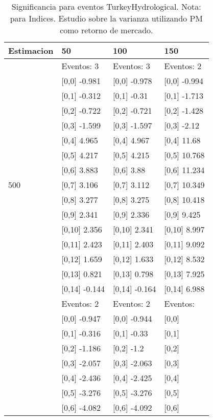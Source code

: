 \begin{table}

\caption{Significancia para eventos TurkeyHydrological. Nota: para Indices. Estudio sobre la varianza utilizando PM como retorno de mercado.}
\centering
\begin{tabular}[t]{llll}
\toprule
Estimacion & 50 & 100 & 150\\
\midrule
 & Eventos:  3 & Eventos:  3 & Eventos:  2\\
 & {}[0,0] -0.981 & {}[0,0] -0.978 & {}[0,0] -0.994\\
 & {}[0,1] -0.312 & {}[0,1] -0.31 & {}[0,1] -1.713\\
 & {}[0,2] -0.722 & {}[0,2] -0.721 & {}[0,2] -1.428\\
 & {}[0,3] -1.599 & {}[0,3] -1.597 & {}[0,3] -2.12\\
\addlinespace
 & {}[0,4] 4.965 & {}[0,4] 4.967 & {}[0,4] 11.68\\
 & {}[0,5] 4.217 & {}[0,5] 4.215 & {}[0,5] 10.768\\
 & {}[0,6] 3.883 & {}[0,6] 3.88 & {}[0,6] 11.234\\
500 & {}[0,7] 3.106 & {}[0,7] 3.112 & {}[0,7] 10.349\\
 & {}[0,8] 3.277 & {}[0,8] 3.275 & {}[0,8] 10.418\\
\addlinespace
 & {}[0,9] 2.341 & {}[0,9] 2.336 & {}[0,9] 9.425\\
 & {}[0,10] 2.356 & {}[0,10] 2.341 & {}[0,10] 8.997\\
 & {}[0,11] 2.423 & {}[0,11] 2.403 & {}[0,11] 9.092\\
 & {}[0,12] 1.659 & {}[0,12] 1.633 & {}[0,12] 8.532\\
 & {}[0,13] 0.821 & {}[0,13] 0.798 & {}[0,13] 7.925\\
\addlinespace
 & {}[0,14] -0.144 & {}[0,14] -0.164 & {}[0,14] 6.988\\
 & Eventos:  2 & Eventos:  2 & Eventos:\\
 & {}[0,0] -0.947 & {}[0,0] -0.944 & {}[0,0]\\
 & {}[0,1] -0.316 & {}[0,1] -0.33 & {}[0,1]\\
 & {}[0,2] -1.186 & {}[0,2] -1.2 & {}[0,2]\\
\addlinespace
 & {}[0,3] -2.057 & {}[0,3] -2.063 & {}[0,3]\\
 & {}[0,4] -2.436 & {}[0,4] -2.425 & {}[0,4]\\
 & {}[0,5] -3.276 & {}[0,5] -3.276 & {}[0,5]\\
 & {}[0,6] -4.082 & {}[0,6] -4.092 & {}[0,6]\\

\end{tabular}
\end{table}
